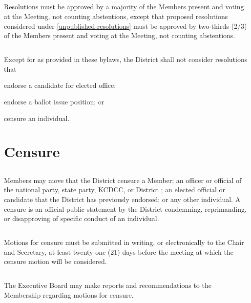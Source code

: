 \subsection{}
Resolutions must be approved by a majority of the Members present and voting at the Meeting, not counting abstentions, except that proposed resolutions considered under \autoref{unpublished-resolutions} must be approved by two-thirds (2/3) of the Members present and voting at the Meeting, not counting abstentions.

\subsection{}
Except for as provided in these bylaws, the \fortythird{} District  shall not consider resolutions that
\begin{inlinealphalist}
    \item endorse a candidate for elected office;
    \item endorse a ballot issue position; or
    \item censure an individual.
\end{inlinealphalist}

\section{Censure}
\subsection{}
Members may move that the \fortythird{} District  censure a Member; an officer or official of the national party, state party, KCDCC, or \fortythird{} District ; an elected official or candidate that the \fortythird{} District  has previously endorsed; or any other individual. A censure is an official public statement by the \fortythird{} District  condemning, reprimanding, or disapproving of specific conduct of an individual.

\subsection{}
Motions for censure must be submitted in writing, or electronically to the Chair and Secretary, at least twenty-one (21) days before the meeting at which the censure motion will be considered.

\subsection{}
The Executive Board may make reports and recommendations to the Membership regarding motions for censure.

